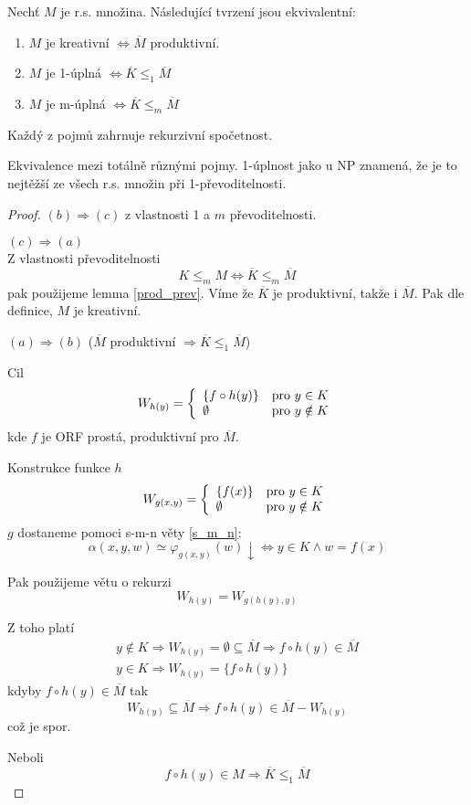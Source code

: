 \begin{theorem}
	Nechť $M$ je r.s. množina.
	Následující tvrzení jsou ekvivalentní:
	\begin{enumerate}[label=(\alph*)]
	    	\item $M$ je kreativní $\iff \overline{M}$ produktivní.
		\item $M$ je 1-úplná $\iff \overline{K} \leq_1 \overline{M}$
		\item $M$ je m-úplná $\iff \overline{K} \leq_m \overline{M}$
	\end{enumerate}
	Každý z pojmů zahrnuje rekurzivní spočetnost.

	Ekvivalence mezi totálně různými pojmy. 1-úplnost jako u NP znamená, že je to nejtěžší ze všech r.s. množin při 1-převoditelnosti.
\end{theorem}
\begin{proof}
	$(b) \Rightarrow (c)$ z vlastnosti 1 a $m$ převoditelnosti.

	$(c) \Rightarrow (a)$ \\
	Z vlastnosti převoditelnosti
	\[ K \leq_m M \iff \overline{K} \leq_m \overline{M} \]
	pak použijeme lemma \cref{prod_prev}.
	Víme že $\overline{K}$ je produktivní, takže i $\overline{M}$.
	Pak dle definice, $M$ je kreativní.

	$(a) \Rightarrow (b)$ ($\overline{M}$ produktivní $\Rightarrow \overline{K} \leq_1 \overline{M}$)

	Cil
	\[ W_{h(y)} = \left\{ \begin{array}{ll}  \{ f \circ h(y) \}  & \mbox{pro }  y \in K  \\  \emptyset  & \mbox{pro }  y \notin K  \end{array} \right. \]
	kde $f$ je ORF prostá, produktivní pro $\overline{M}$.

	Konstrukce funkce $h$
	\[ W_{g(x, y)} = \left\{ \begin{array}{ll}  \{ f(x) \}  & \mbox{pro }  y \in K  \\  \emptyset  & \mbox{pro }  y \notin K  \end{array} \right. \]
	$g$ dostaneme pomoci s-m-n věty \cref{s_m_n}:
	\[ \alpha(x, y, w) \simeq \varphi_{g(x, y)} (w) \downarrow \iff y \in K \land w = f(x) \]

	Pak použijeme větu o rekurzi
	\[ W_{h(y)} = W_{g(h(y), y)} \]

	Z toho platí
	\begin{gather*}
		y \notin K \Rightarrow W_{h(y)} = \emptyset \subseteq \overline{M} \Rightarrow f \circ h(y) \in \overline{M} \\
		y \in K \Rightarrow W_{h(y)} = \{ f \circ h(y) \}
	\end{gather*}
	kdyby $f \circ h(y) \in \overline{M}$ tak
	\[ W_{h(y)} \subseteq \overline{M} \Rightarrow f \circ h(y) \in \overline{M} - W_{h(y)} \]
	což je spor.

	Neboli
	\[ f \circ h(y) \in M \Rightarrow \overline{K} \leq_1 \overline{M} \]
\end{proof}

